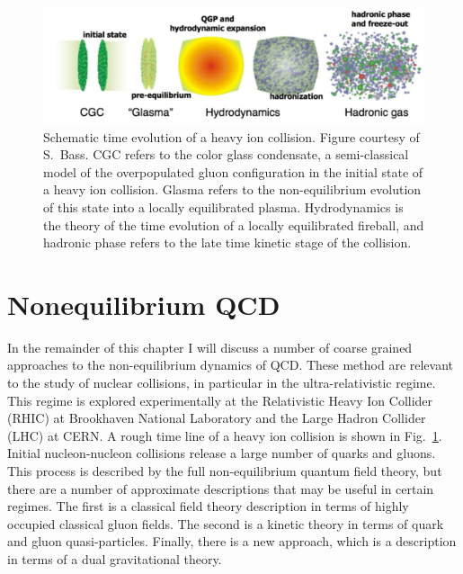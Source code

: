 \begin{figure}[t]
\bc\includegraphics[width=0.95 \textwidth]{Chapter2-figures/hic_evol_schem.pdf}\ec
\caption{\label{fig_hic}
Schematic time evolution of a heavy ion collision. Figure courtesy 
of S.~Bass. CGC refers to the color glass condensate, a semi-classical
model of the overpopulated gluon configuration in the initial state
of a heavy ion collision. Glasma refers to the non-equilibrium evolution 
of this state into a locally equilibrated plasma. Hydrodynamics is 
the theory of the time evolution of a locally equilibrated fireball,
and hadronic phase refers to the late time kinetic stage of the
collision. }
\end{figure}


\section{Nonequilibrium QCD}
\label{sec_neq_qcd}

 In the remainder of this chapter I will discuss a number of coarse
grained approaches to the non-equilibrium dynamics of QCD. These 
method are relevant to the study of nuclear collisions, in particular
in the ultra-relativistic regime. This regime is explored experimentally
at the Relativistic Heavy Ion Collider (RHIC) at Brookhaven National
Laboratory and the Large Hadron Collider (LHC) at CERN. A rough 
time line of a heavy ion collision is shown in Fig.~\ref{fig_hic}.
Initial nucleon-nucleon collisions release a large number of quarks 
and gluons. This process is described by the full non-equilibrium
quantum field theory, but there are a number of approximate descriptions 
that may be useful in certain regimes. The first is a classical 
field theory description in terms of highly occupied classical 
gluon fields. The second is a kinetic theory in terms of quark and
gluon quasi-particles. Finally, there is a new approach, which is a 
description in terms of a dual gravitational theory. 

